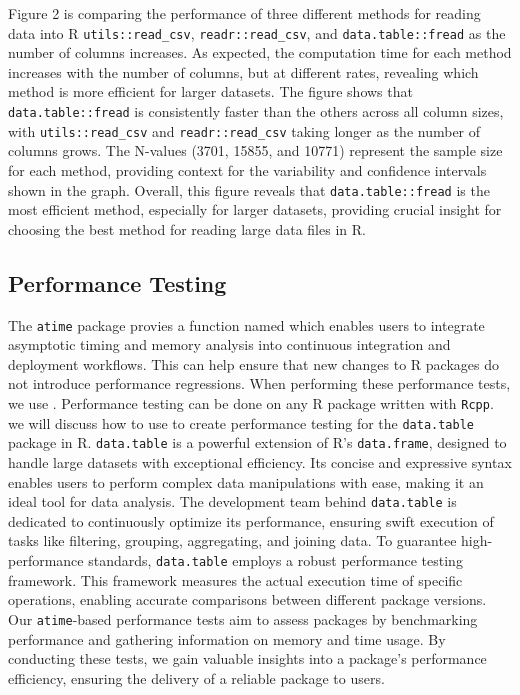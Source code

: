 \noindent Figure 2 is comparing the performance of three different methods for reading data into R \texttt{utils::read\_csv}, \texttt{readr::read\_csv}, and \texttt{data.table::fread} as the number of columns increases. As expected, the computation time for each method increases with the number of columns, but at different rates, revealing which method is more efficient for larger datasets. The figure shows that \texttt{data.table::fread} is consistently faster than the others across all column sizes, with \texttt{utils::read\_csv} and \texttt{readr::read\_csv} taking longer as the number of columns grows. The N-values (3701, 15855, and 10771) represent the sample size for each method, providing context for the variability and confidence intervals shown in the graph. Overall, this figure reveals that \texttt{data.table::fread} is the most efficient method, especially for larger datasets, providing crucial insight for choosing the best method for reading large data files in R.\\

\subsection{Performance Testing}
The \texttt{atime} package provies a function named  which enables users to integrate asymptotic timing and memory analysis into continuous integration and deployment workflows. 
This can help ensure that new changes to R packages do not introduce performance regressions. When performing these performance tests, we use .
Performance testing can be done on any R package written with \texttt{Rcpp}.\\

\noindent we will discuss how to use  to create performance testing for the \texttt{data.table} package in R.
\texttt{data.table} is a powerful extension of R's \texttt{data.frame}, designed to handle large datasets with exceptional efficiency. Its concise and expressive syntax enables users to perform complex data manipulations with ease, making it an ideal tool for data analysis. The development team behind \texttt{data.table} is dedicated to continuously optimize its performance, ensuring swift execution of tasks like filtering, grouping, aggregating, and joining data.
\vspace{0.1in}
To guarantee high-performance standards, \texttt{data.table} employs a robust performance testing framework. This framework measures the actual execution time of specific operations, enabling accurate comparisons between different package versions. 
Our \texttt{atime}-based performance tests aim to assess packages by benchmarking performance and gathering information on memory and time usage. 
\vspace{0.1in}
By conducting these tests, we gain valuable insights into a package's performance efficiency, ensuring the delivery of a reliable package to users.
\vspace{0.1in}

